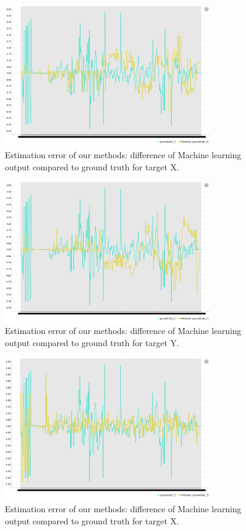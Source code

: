 \documentclass[a4paper,twoside]{article}
\begin{document}
\begin{figure}

  \includegraphics[width=90mm]{X.png}
  \caption{Estimation error of our methods:  difference of Machine learning output compared to ground truth for target X. }
  \label{fig:X}
\end{figure}
\begin{figure}

  \includegraphics[width=90mm]{Y.png}
  \caption{Estimation error of our methods:  difference of Machine learning output compared to ground truth for target Y. }
  \label{fig:Y}
\end{figure}
\begin{figure}

  \includegraphics[width=90mm]{Z.png}
  \caption{Estimation error of our methods:  difference of Machine learning output compared to ground truth for target X. }
  \label{fig:Z}
\end{figure}
\end{document}

